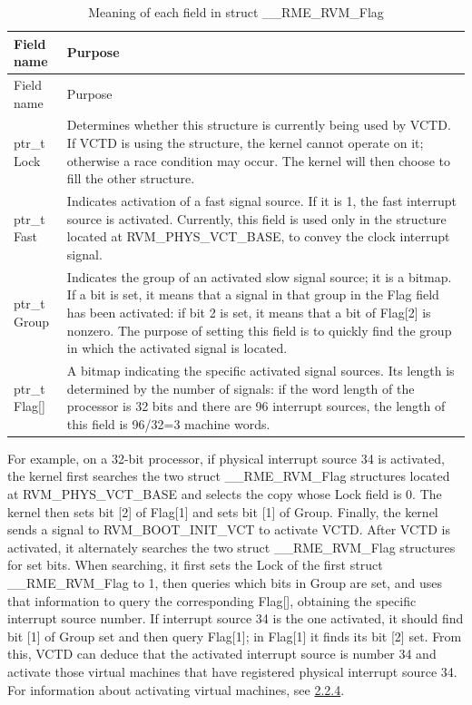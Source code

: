 \begin{xltabular}{\textwidth}{@{}>{\hsize\raggedright\arraybackslash}X>{\hsize\raggedright\arraybackslash}X@{}}
\caption{Meaning of each field in struct \_\allowbreak{}\_\allowbreak{}RME\_\allowbreak{}RVM\_\allowbreak{}Flag}\label{tab:2-1}\\
\toprule
Field name & Purpose\tabularnewline
\endfirsthead
\toprule
Field name & Purpose\tabularnewline
\midrule
\endhead
\bottomrule
\endlastfoot
ptr\_\allowbreak{}t Lock &
Determines whether this structure is currently being used by VCTD. If VCTD is using the structure, the kernel cannot operate on it; otherwise a race condition may occur. The kernel will then choose to fill the other structure.\tabularnewline
ptr\_\allowbreak{}t Fast &
Indicates activation of a fast signal source. If it is 1, the fast interrupt source is activated. Currently, this field is used only in the structure located at RVM\_\allowbreak{}PHYS\_\allowbreak{}VCT\_\allowbreak{}BASE, to convey the clock interrupt signal.\tabularnewline
ptr\_\allowbreak{}t Group &
Indicates the group of an activated slow signal source; it is a bitmap. If a bit is set, it means that a signal in that group in the Flag field has been activated: if bit 2 is set, it means that a bit of Flag{[}2{]} is nonzero. The purpose of setting this field is to quickly find the group in which the activated signal is located.\tabularnewline
ptr\_\allowbreak{}t Flag{[}{]} &
A bitmap indicating the specific activated signal sources. Its length is determined by the number of signals: if the word length of the processor is 32 bits and there are 96 interrupt sources, the length of this field is 96/32=3 machine words.\tabularnewline
\end{xltabular}

For example, on a 32-bit processor, if physical interrupt source 34 is activated, the kernel first searches the two struct
\_\_RME\_RVM\_Flag structures located at RVM\_PHYS\_VCT\_BASE and selects the copy whose Lock field is 0. The kernel then sets bit {[}2{]} of Flag{[}1{]} and sets bit {[}1{]} of Group. Finally, the kernel sends a signal to RVM\_BOOT\_INIT\_VCT to activate VCTD. After VCTD is activated, it alternately searches the two struct
\_\_RME\_RVM\_Flag structures for set bits. When searching, it first sets the Lock of the first struct
\_\_RME\_RVM\_Flag to 1, then queries which bits in Group are set, and uses that information to query the corresponding Flag{[}{]}, obtaining the specific interrupt source number. If interrupt source 34 is the one activated, it should find bit {[}1{]} of Group set and then query Flag{[}1{]}; in Flag{[}1{]} it finds its bit {[}2{]} set. From this, VCTD can deduce that the activated interrupt source is number 34 and activate those virtual machines that have registered physical interrupt source 34. For information about activating virtual machines, see \protect\hyperref[subsec:2-2-4]{2.2.4}.

